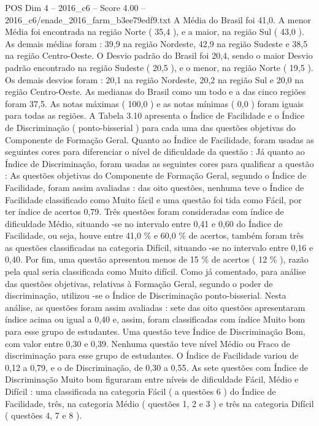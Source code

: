\begin{textsample}{POS Dim 4 – 2016\_c6 – Score 4.00 – 2016\_c6/enade\_2016\_farm\_b3ee79edf9.txt}
A Média do Brasil foi 41,0.
A menor Média foi encontrada na região Norte ( 35,4 ), e a maior, na região Sul ( 43,0 ).
As demais médias foram : 39,9 na região Nordeste, 42,9 na região Sudeste e 38,5 na região Centro-Oeste.
O Desvio padrão do Brasil foi 20,4, sendo o maior Desvio padrão encontrado na região Sudeste ( 20,5 ), e o menor, na região Norte ( 19,5 ).
Os demais desvios foram : 20,1 na região Nordeste, 20,2 na região Sul e 20,0 na região Centro-Oeste.
As medianas do Brasil como um todo e a das cinco regiões foram 37,5.
As notas máximas ( 100,0 ) e as notas mínimas ( 0,0 ) foram iguais para todas as regiões.
A Tabela 3.10 apresenta o Índice de Facilidade e o Índice de Discriminação ( ponto-bisserial ) para cada uma das questões objetivas do Componente de Formação Geral.
Quanto ao Índice de Facilidade, foram usadas as seguintes cores para diferenciar o nível de dificuldade da questão : Já quanto ao Índice de Discriminação, foram usadas as seguintes cores para qualificar a questão : As questões objetivas do Componente de Formação Geral, segundo o Índice de Facilidade, foram assim avaliadas : das oito questões, nenhuma teve o Índice de Facilidade classificado como Muito fácil e uma questão foi tida como Fácil, por ter índice de acertos 0,79.
Três questões foram consideradas com índice de dificuldade Médio, situando -se no intervalo entre 0,41 e 0,60 do Índice de Facilidade, ou seja, houve entre 41,0 \% e 60,0 \% de acertos, também foram três as questões classificadas na categoria Difícil, situando -se no intervalo entre 0,16 e 0,40.
Por fim, uma questão apresentou menos de 15 \% de acertos ( 12 \% ), razão pela qual seria classificada como Muito difícil.
Como já comentado, para análise das questões objetivas, relativas à Formação Geral, segundo o poder de discriminação, utilizou -se o Índice de Discriminação ponto-bisserial.
Nesta análise, as questões foram assim avaliadas : sete das oito questões apresentaram índice acima ou igual a 0,40 e, assim, foram classificadas com índice Muito bom para esse grupo de estudantes.
Uma questão teve Índice de Discriminação Bom, com valor entre 0,30 e 0,39.
Nenhuma questão teve nível Médio ou Fraco de discriminação para esse grupo de estudantes.
O Índice de Facilidade variou de 0,12 a 0,79, e o de Discriminação, de 0,30 a 0,55.
As sete questões com Índice de Discriminação Muito bom figuraram entre níveis de dificuldade Fácil, Médio e Difícil : uma classificada na categoria Fácil ( a questões 6 ) do Índice de Facilidade, três, na categoria Médio ( questões 1, 2 e 3 ) e três na categoria Difícil ( questões 4, 7 e 8 ).

\end{textsample}
